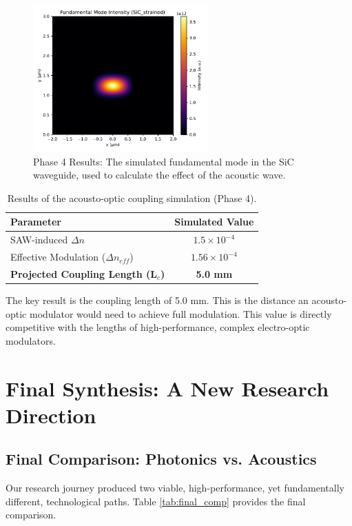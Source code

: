 \documentclass[12pt, a4paper, numbers]{report}
\begin{document}
\begin{figure}[htbp]
    \centering
    \includegraphics[width=0.6\textwidth]{simulation_v4_mode_SiC_strained.pdf}
    \caption{Phase 4 Results: The simulated fundamental mode in the SiC waveguide, used to calculate the effect of the acoustic wave.}
    \label{fig:sicmode}
\end{figure}

\begin{table}[htbp]
\caption{Results of the acousto-optic coupling simulation (Phase 4).}
\label{tab:cycle4}
\centering
\begin{tabular}{lc}
\toprule
\textbf{Parameter} & \textbf{Simulated Value} \\
\midrule
SAW-induced $\Delta n$ & $1.5 \times 10^{-4}$ \\
Effective Modulation ($\Delta n_{eff}$) & $1.56 \times 10^{-4}$ \\
\textbf{Projected Coupling Length (L$_c$)} & \textbf{5.0 mm} \\
\bottomrule
\end{tabular}
\end{table}

The key result is the coupling length of 5.0 mm. This is the distance an acousto-optic modulator would need to achieve full modulation. This value is directly competitive with the lengths of high-performance, complex electro-optic modulators.

\chapter{Final Synthesis: A New Research Direction}
\section{Final Comparison: Photonics vs. Acoustics}
Our research journey produced two viable, high-performance, yet fundamentally different, technological paths. Table \ref{tab:final_comp} provides the final comparison.
\end{document}
